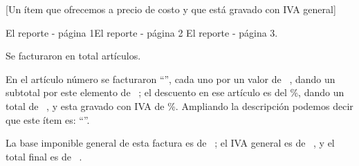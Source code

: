 \documentclass[
soloreporte,
]{factura}
\begin{document}
\begin{factura}
 [Un ítem que ofrecemos a precio de costo y que está gravado con IVA general]\label{primeritem}
\end{factura}


\begin{reporte}
 El reporte - página 1\newpage El reporte - página 2 \newpage El reporte - página 3.

 Se facturaron en total  artículos.

 En el artículo número  se facturaron  “”, cada uno por un valor de \Moneda~, dando un subtotal por este elemento de \Moneda~; el descuento en ese artículo es del \%, dando un total de \Moneda~, y esta gravado con IVA de \%. Ampliando la descripción podemos decir que este ítem es: “”.

 La base imponible general de esta factura es de \Moneda~\numprint\BIG; el IVA general es de \Moneda~\numprint\AlicuotaG, y el total final es de \Moneda~\numprint\Total.

 \vspace{1.5cm}
\end{reporte}

\Ejemplo
\end{document}
